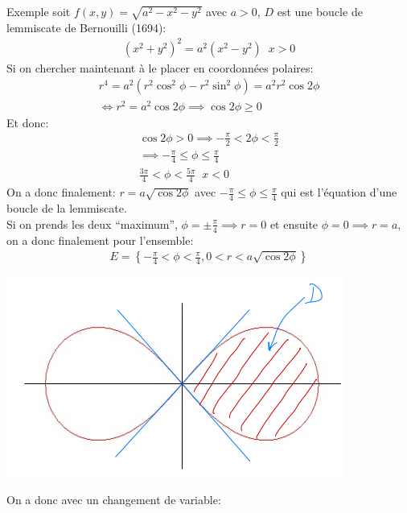 \begin{parag}{Exemple}
    soit $f\left(x, y\right) = \sqrt{a^2 - x^2 - y^2}$ avec $a > 0$, $D$ est une boucle de lemmiscate de Bernouilli (1694):
    \begin{align*} \left(x^2 + y^2\right)^2 =  a^2\left(x^2 - y^2\right) \;\; x > 0 \end{align*}
    Si on chercher maintenant à le placer en coordonnées polaires:
    \begin{align*} 
        r^4 =  a^2\left(r^2\cos^2\phi - r^2 \sin^2 \phi\right) =  a^2 r^2 \cos 2\phi\\
        \iff r^2 =  a^2 \cos 2 \phi \implies \cos 2 \phi \geq 0
    \end{align*}
    Et donc:
    \begin{align*} 
        \cos 2 \phi > 0 \implies - \frac{\pi}{2} < 2\phi < \frac{\pi}{2} \\
        \implies - \frac{\pi}{4} \leq \phi \leq \frac{\pi}{4} \\
        \frac{3\pi}{4}< \phi < \frac{5\pi}{4} \; \; x <0
    \end{align*}
    On a donc finalement:
    $r =  a \sqrt{\cos 2 \phi}$ avec $- \frac{\pi}{4} \leq \phi \leq \frac{\pi}{4}$ qui est l'équation d'une boucle de la lemmiscate. \\
    Si on prends les deux ``maximum'', $\phi = \pm \frac{\pi}{4} \implies r = 0$ et ensuite $\phi =  0 \implies r = a$, on a donc finalement pour l'ensemble:
    \begin{align*} 
        E =  \left\{-\frac{\pi}{4} < \phi < \frac{\pi}{4}, 0 < r < a\sqrt{\cos 2 \phi} \right\}
    \end{align*}
        \begin{center}
            \includegraphics[scale=0-8]{42025-05-21.png}
        \end{center}
        On a donc avec un changement de variable:
        \begin{align*} 

\end{align*}
\end{parag}
